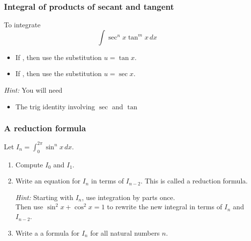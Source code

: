 \begin{frame}[t]
	\frametitle{Integral of products of secant and tangent}

	To integrate
	\[
		\int \sec^{n}x \tan^{m}x \, dx
	\]
	\begin{itemize}
		\item If \boxed{\phantom{spacespace}}, then use the substitution $\displaystyle
			u = \tan x$.

		\item If \boxed{\phantom{spacespace}}, then use the substitution $\displaystyle
			u = \sec x$.
	\end{itemize}

	\vfill

	{\fontsize{13}{13}\selectfont \emph{Hint:} You will need \begin{itemize}\begin{multicols}{2}\item $\displaystyle \frac{d}{dx}\left[ \tan x \right] = \ldots$ \item $\displaystyle \frac{d}{dx}\left[ \sec x \right] = \ldots$\end{multicols}

	\item The trig identity involving $\sec$ and $\tan$\end{itemize} }
\end{frame}

\begin{frame}[t]
	\fontsize{13}{13}\selectfont
	\frametitle{A reduction formula}

	Let $\displaystyle I_{n}= \int_{0}^{2\pi}\sin^{n}x \, dx$.
	\vspace{.3cm}

	\begin{enumerate}
		\item Compute $I_{0}$ and $I_{1}$.
			\vspace{.3cm}

		\item Write an equation for $\displaystyle I_{n}$ in terms of $\displaystyle
			I_{n-2}$. This is called a reduction formula.
			\vspace{.3cm}

			\emph{Hint:} Starting with $I_{n}$, use integration by parts once. \\ Then
			use $\displaystyle \sin^{2}x + \cos^{2}x = 1$ to rewrite the new integral in
			terms of $\displaystyle I_{n}$ and $\displaystyle I_{n-2}$.
			\vspace{.3cm}

		\item Write a a formula for $I_{n}$ for all natural numbers $n$.

	\end{enumerate}
\end{frame}

